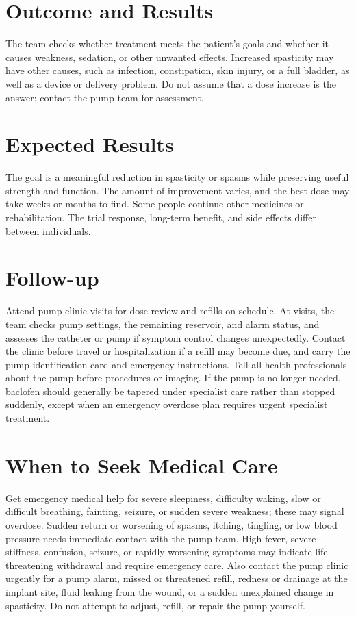\section*{Outcome and Results}
The team checks whether treatment meets the patient's goals and whether it causes weakness, sedation, or other unwanted effects. Increased spasticity may have other causes, such as infection, constipation, skin injury, or a full bladder, as well as a device or delivery problem. Do not assume that a dose increase is the answer; contact the pump team for assessment.

\section*{Expected Results}
The goal is a meaningful reduction in spasticity or spasms while preserving useful strength and function. The amount of improvement varies, and the best dose may take weeks or months to find. Some people continue other medicines or rehabilitation. The trial response, long-term benefit, and side effects differ between individuals.

\section*{Follow-up}
Attend pump clinic visits for dose review and refills on schedule. At visits, the team checks pump settings, the remaining reservoir, and alarm status, and assesses the catheter or pump if symptom control changes unexpectedly. Contact the clinic before travel or hospitalization if a refill may become due, and carry the pump identification card and emergency instructions. Tell all health professionals about the pump before procedures or imaging. If the pump is no longer needed, baclofen should generally be tapered under specialist care rather than stopped suddenly, except when an emergency overdose plan requires urgent specialist treatment.

\section*{When to Seek Medical Care}
Get emergency medical help for severe sleepiness, difficulty waking, slow or difficult breathing, fainting, seizure, or sudden severe weakness; these may signal overdose. Sudden return or worsening of spasms, itching, tingling, or low blood pressure needs immediate contact with the pump team. High fever, severe stiffness, confusion, seizure, or rapidly worsening symptoms may indicate life-threatening withdrawal and require emergency care. Also contact the pump clinic urgently for a pump alarm, missed or threatened refill, redness or drainage at the implant site, fluid leaking from the wound, or a sudden unexplained change in spasticity. Do not attempt to adjust, refill, or repair the pump yourself.

